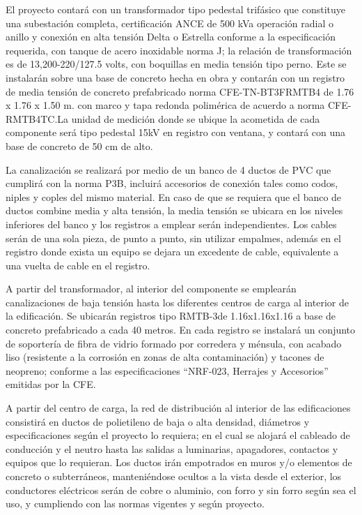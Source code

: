 \documentclass{article}
\begin{document}
\bigskip

El proyecto contará con un transformador tipo pedestal trifásico que constituye una subestación completa, certificación ANCE de 500 kVa operación radial o anillo y conexión en alta tensión Delta o Estrella conforme a la especificación requerida, con tanque de acero inoxidable norma J; la relación de transformación es de 13,200-220/127.5 volts, con boquillas en media tensión tipo perno. Este se instalarán sobre una base de concreto hecha en obra y contarán con un registro de media tensión de concreto prefabricado norma CFE-TN-BT3FRMTB4 de 1.76 x 1.76 x 1.50 m. con marco y tapa redonda polimérica de acuerdo a norma CFE-RMTB4TC.La unidad de medición donde se ubique la acometida de cada componente será tipo pedestal 15kV en registro con ventana, y contará con una base de concreto de 50 cm de alto.


\bigskip

La canalización se realizará por medio de un banco de 4 ductos de PVC que cumplirá con la norma P3B, incluirá accesorios de conexión tales como codos, niples y coples del mismo material. En caso de que se requiera que el banco de ductos combine media y alta tensión, la media tensión se ubicara en los niveles inferiores del banco y los registros a emplear serán independientes. Los cables serán de una sola pieza, de punto a punto, sin utilizar empalmes, además en el registro donde exista un equipo se dejara un excedente de cable, equivalente a una vuelta de cable en el registro. 


\bigskip

A partir del transformador, al interior del componente se emplearán canalizaciones de baja tensión hasta los diferentes centros de carga al interior de la edificación. Se ubicarán registros tipo RMTB-3de 1.16x1.16x1.16 a base de concreto prefabricado a cada 40 metros. En cada registro se instalará un conjunto de soportería de fibra de vidrio formado por corredera y ménsula, con acabado liso (resistente a la corrosión en zonas de alta contaminación) y tacones de neopreno; conforme a las especificaciones “NRF-023, Herrajes y Accesorios” emitidas por la CFE. 


\bigskip

A partir del centro de carga, la red de distribución al interior de las edificaciones consistirá en ductos de polietileno de baja o alta densidad, diámetros y especificaciones según el proyecto lo requiera; en el cual se alojará el cableado de conducción y el neutro hasta las salidas a luminarias, apagadores, contactos y equipos que lo requieran. Los ductos irán empotrados en muros y/o elementos de concreto o subterráneos, manteniéndose ocultos a la vista desde el exterior, los conductores eléctricos serán de cobre o aluminio, con forro y sin forro según sea el uso, y cumpliendo con las normas vigentes y según proyecto.
\end{document}
